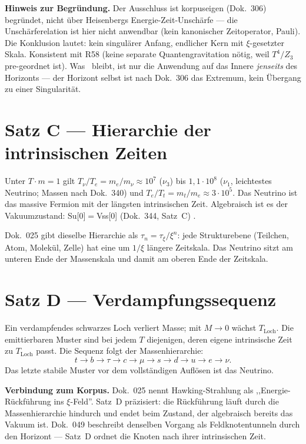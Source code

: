 \textbf{Hinweis zur Begründung.} Der Ausschluss ist korpuseigen
(Dok.~306) begründet, nicht über Heisenbergs Energie-Zeit-Unschärfe ---
die Unschärferelation ist hier nicht anwendbar (kein kanonischer
Zeitoperator, Pauli). Die Konklusion lautet: kein singulärer Anfang,
endlicher Kern mit $\xi$-gesetzter Skala. Konsistent mit R58
(keine separate Quantengravitation nötig, weil $T^4/Z_3$ pre-geordnet
ist). Was \SM\ bleibt, ist nur die Anwendung auf das Innere \emph{jenseits}
des Horizonts --- der Horizont selbst ist nach Dok.~306 das Extremum, kein
Übergang zu einer Singularität.

\section{Satz C --- Hierarchie der intrinsischen Zeiten}

\begin{theorem}
Unter $T\cdot m=1$ gilt $T_\nu/T_e = m_e/m_\nu \approx 10^7$ ($\nu_3$) bis
$1{,}1\cdot10^8$ ($\nu_1$, leichtestes Neutrino; Massen nach Dok.~340) und
$T_e/T_t = m_t/m_e \approx 3\cdot10^5$. Das Neutrino ist das massive
Fermion mit der längsten intrinsischen Zeit. Algebraisch ist es der
Vakuumzustand: Su[0]$=$Vss[0] (Dok.~344, Satz~C) \BM.
\end{theorem}

Dok.~025 gibt dieselbe Hierarchie als $\tau_n=\tau_\xi/\xi^n$: jede
Strukturebene (Teilchen, Atom, Molekül, Zelle) hat eine um $1/\xi$ längere
Zeitskala. Das Neutrino sitzt am unteren Ende der Massenskala und damit am
oberen Ende der Zeitskala.

\section{Satz D --- Verdampfungssequenz}

\begin{theorem}
Ein verdampfendes schwarzes Loch verliert Masse; mit $M\to0$ wächst
$T_\text{Loch}$. Die emittierbaren Muster sind bei jedem $T$ diejenigen,
deren eigene intrinsische Zeit zu $T_\text{Loch}$ passt. Die Sequenz folgt
der Massenhierarchie:
\[
  t\to b\to\tau\to c\to\mu\to s\to d\to u\to e\to\nu.
\]
Das letzte stabile Muster vor dem vollständigen Auflösen ist das
Neutrino.
\end{theorem}

\textbf{Verbindung zum Korpus.} Dok.~025 nennt Hawking-Strahlung als
,,Energie-Rückführung ins $\xi$-Feld''. Satz~D präzisiert: die Rückführung
läuft durch die Massenhierarchie hindurch und endet beim Zustand, der
algebraisch bereits das Vakuum ist. Dok.~049 beschreibt denselben Vorgang
als Feldknotentunneln durch den Horizont --- Satz~D ordnet die Knoten nach
ihrer intrinsischen Zeit.

